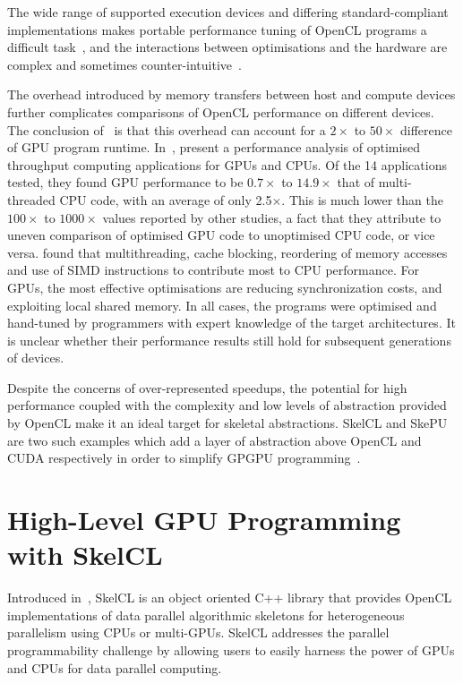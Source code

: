The wide range of supported execution devices and differing
standard-compliant implementations makes portable performance tuning
of OpenCL programs a difficult task~\cite{Rul2010}, and the
interactions between optimisations and the hardware are complex and
sometimes counter-intuitive~\cite{Ryoo2008}.

The overhead introduced by memory transfers between host and compute
devices further complicates comparisons of OpenCL performance on
different devices. The conclusion of~\cite{Gregg2011} is that this
overhead can account for a $2\times$ to $50\times$ difference of GPU
program runtime. In~\cite{Lee2010}, \citeauthor{Lee2010} present a
performance analysis of optimised throughput computing applications
for GPUs and CPUs. Of the 14 applications tested, they found GPU
performance to be $0.7\times$ to $14.9\times$ that of multi-threaded
CPU code, with an average of only 2.5$\times$. This is much lower than
the $100\times$ to $1000\times$ values reported by other studies, a
fact that they attribute to uneven comparison of optimised GPU code to
unoptimised CPU code, or vice versa. \citeauthor{Lee2010} found that
multithreading, cache blocking, reordering of memory accesses and use
of SIMD instructions to contribute most to CPU performance. For GPUs,
the most effective optimisations are reducing synchronization costs,
and exploiting local shared memory. In all cases, the programs were
optimised and hand-tuned by programmers with expert knowledge of the
target architectures. It is unclear whether their performance results
still hold for subsequent generations of devices.

Despite the concerns of over-represented speedups, the potential for
high performance coupled with the complexity and low levels of
abstraction provided by OpenCL make it an ideal target for skeletal
abstractions. SkelCL and SkePU are two such examples which add a layer
of abstraction above OpenCL and CUDA respectively in order to simplify
GPGPU programming~\cite{Enmyren2010}.

\section{High-Level GPU Programming with
  SkelCL}\label{sec:skelcl-intro}

Introduced in~\cite{Steuwer2011}, SkelCL is an object oriented C++
library that provides OpenCL implementations of data parallel
algorithmic skeletons for heterogeneous parallelism using CPUs or
multi-GPUs. SkelCL addresses the parallel programmability challenge by
allowing users to easily harness the power of GPUs and CPUs for data
parallel computing.

